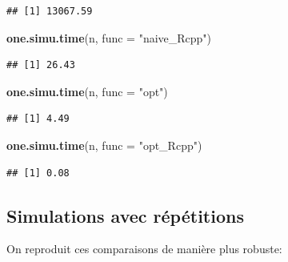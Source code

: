 \documentclass[
]{article}
\newenvironment{Shaded}{\begin{snugshade}}{\end{snugshade}}
\newcommand{\AttributeTok}[1]{\textcolor[rgb]{0.13,0.29,0.53}{#1}}
\newcommand{\FunctionTok}[1]{\textcolor[rgb]{0.13,0.29,0.53}{\textbf{#1}}}
\newcommand{\NormalTok}[1]{#1}
\newcommand{\StringTok}[1]{\textcolor[rgb]{0.31,0.60,0.02}{#1}}
\begin{document}
\begin{verbatim}
## [1] 13067.59
\end{verbatim}

\begin{Shaded}
\begin{Highlighting}[]
\FunctionTok{one.simu.time}\NormalTok{(n, }\AttributeTok{func =} \StringTok{"naive\_Rcpp"}\NormalTok{)}
\end{Highlighting}
\end{Shaded}

\begin{verbatim}
## [1] 26.43
\end{verbatim}

\begin{Shaded}
\begin{Highlighting}[]
\FunctionTok{one.simu.time}\NormalTok{(n, }\AttributeTok{func =} \StringTok{"opt"}\NormalTok{)}
\end{Highlighting}
\end{Shaded}

\begin{verbatim}
## [1] 4.49
\end{verbatim}

\begin{Shaded}
\begin{Highlighting}[]
\FunctionTok{one.simu.time}\NormalTok{(n, }\AttributeTok{func =} \StringTok{"opt\_Rcpp"}\NormalTok{)}
\end{Highlighting}
\end{Shaded}

\begin{verbatim}
## [1] 0.08
\end{verbatim}

\subsection{Simulations avec
répétitions}\label{simulations-avec-ruxe9puxe9titions}

On reproduit ces comparaisons de manière plus robuste:
\end{document}
